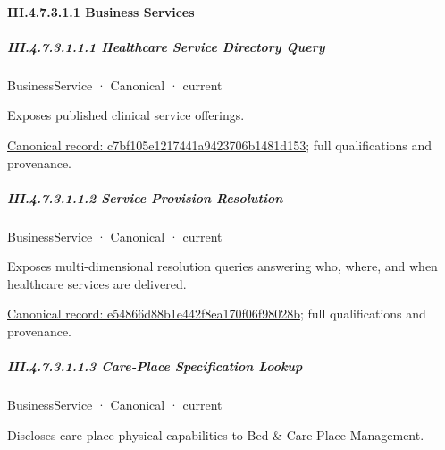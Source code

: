 \paragraph*{III.4.7.3.1.1 Business Services}
\label{navigation:III.4.7.3.1.1}

\subparagraph*{III.4.7.3.1.1.1 Healthcare Service Directory Query}
\label{navigation:III.4.7.3.1.1.1}

\label{element:c7bf105e1217441a9423706b1481d153}
{\small BusinessService · Canonical · current}\par

Exposes published clinical service offerings.


{\footnotesize \href{../../../../continuum/business/business-service/c7bf105e1217441a9423706b1481d153.md}{Canonical record: c7bf105e1217441a9423706b1481d153}; full qualifications and provenance.}\par
\subparagraph*{III.4.7.3.1.1.2 Service Provision Resolution}
\label{navigation:III.4.7.3.1.1.2}

\label{element:e54866d88b1e442f8ea170f06f98028b}
{\small BusinessService · Canonical · current}\par

Exposes multi-dimensional resolution queries answering who, where, and when healthcare services are delivered.


{\footnotesize \href{../../../../continuum/business/business-service/e54866d88b1e442f8ea170f06f98028b.md}{Canonical record: e54866d88b1e442f8ea170f06f98028b}; full qualifications and provenance.}\par
\subparagraph*{III.4.7.3.1.1.3 Care-Place Specification Lookup}
\label{navigation:III.4.7.3.1.1.3}

\label{element:43b011b0c233408eaf6e555ecbf05d9e}
{\small BusinessService · Canonical · current}\par

Discloses care-place physical capabilities to Bed \& Care-Place Management.


